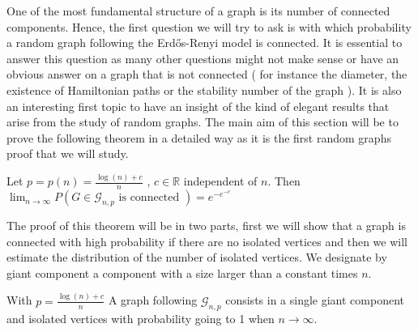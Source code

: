 One of the most fundamental structure of a graph is its number of connected components. 
Hence, the first question we will try to ask is with which probability a random graph following the Erd\H{o}s-Renyi model is connected. 
It is essential to answer this question as many other questions might not make sense or have an obvious answer on a graph that is not connected ( for instance the diameter, the existence of Hamiltonian paths or the stability number of the graph ). 
\newline
It is also an interesting first topic to have an insight of the kind of elegant results that arise from the study of random graphs.
The main aim of this section will be to prove the following theorem in a detailed way as it is the first random graphs proof that we will study.
\begin{theorem}\label{th:connect}
	Let $p = p(n) = \frac{\log(n) + c}{n}$ , $c \in \mathbb{R}$ independent of $n$.
\newline
Then $\lim_{n \to \infty} P(G \in \mathcal{G}_{n, p}\text{ is connected }) = e^{-e^{-c}}$ 
\end{theorem}
The proof of this theorem will be in two parts, first we will show that a graph is connected with high probability if there are no isolated vertices and then we will estimate the distribution of the number of isolated vertices.
We designate by giant component a component with a size larger than a constant times $n$.
\begin{theorem}\label{th:isolcomp}
	With $p = \frac{\log(n) + c}{n}$
	 A graph following $\mathcal{G}_{n, p}$ consists in a single giant component and isolated vertices with probability going to 1 when $n \to \infty$. 
\end{theorem}
